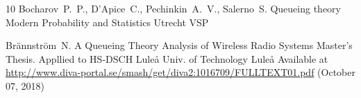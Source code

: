 \begin{thebibliography}{10}
\by Bocharov~P.~P., D'Apice~C., Pechinkin~A.~V., Salerno~S.
\book Queueing theory
\serial Modern Probability and Statistics
\publaddr Utrecht
\publ VSP 



\by Br\"annstr\"om~N.
\thesis A Queueing Theory Analysis of Wireless Radio Systems
\thesisinfo Master's  Thesis. Appllied to HS-DSCH
\publ Lule\r{a} Univ. of Technology
\publaddr Lule\r{a}
\elink
Available at  \url{http://www.diva-portal.se/smash/get/diva2:1016709/FULLTEXT01.pdf} (October 07, 2018)



%
%
%
%
%
%



\end{thebibliography}
